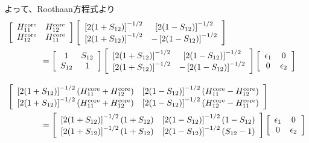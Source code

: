 よって、Roothaan方程式より
\begin{align}
&
	\left[
	\begin{array}{cc}
		H^{\rm core}_{11} & H^{\rm core}_{12} \\
		H^{\rm core}_{12} & H^{\rm core}_{11}
	\end{array}
	\right]
	\left[
	\begin{array}{cc}
		\left[2(1+S_{12})\right]^{-1/2} & \left[2(1-S_{12})\right]^{-1/2} \\
		\left[2(1+S_{12})\right]^{-1/2} & -\left[2(1-S_{12})\right]^{-1/2}
	\end{array}
	\right] \nonumber\\
&\qquad\qquad
=
	\left[
	\begin{array}{cc}
		1 & S_{12} \\
		S_{12} & 1
	\end{array}
	\right]
	\left[
	\begin{array}{cc}
		\left[2(1+S_{12})\right]^{-1/2} & \left[2(1-S_{12})\right]^{-1/2} \\
		\left[2(1+S_{12})\right]^{-1/2} & -\left[2(1-S_{12})\right]^{-1/2}
	\end{array}
	\right]
	\left[
	\begin{array}{cc}
		\epsilon_1 & 0 \\
		0 & \epsilon_2
	\end{array}
	\right] \\[3mm]
%
%
&
	\left[
	\begin{array}{cc}
		\left[2(1+S_{12})\right]^{-1/2}
		(H^{\rm core}_{11} +H^{\rm core}_{12})
		&
		\left[2(1-S_{12})\right]^{-1/2}
		(H^{\rm core}_{11} -H^{\rm core}_{12}) \\
		\left[2(1+S_{12})\right]^{-1/2}
		(H^{\rm core}_{11} +H^{\rm core}_{12})
		&
		\left[2(1-S_{12})\right]^{-1/2}
		(H^{\rm core}_{12} -H^{\rm core}_{11})
	\end{array}
	\right] \nonumber\\
&\qquad\qquad
=
	\left[
	\begin{array}{cc}
		\left[2(1+S_{12})\right]^{-1/2}
		(1+S_{12})
		&
		\left[2(1-S_{12})\right]^{-1/2}
		(1-S_{12}) \\
		\left[2(1+S_{12})\right]^{-1/2}
		(1+S_{12})
		&
		\left[2(1-S_{12})\right]^{-1/2}
		(S_{12}-1)
	\end{array}
	\right]
	\left[
	\begin{array}{cc}
		\epsilon_1 & 0 \\
		0 & \epsilon_2
	\end{array}
	\right]
\end{align}
